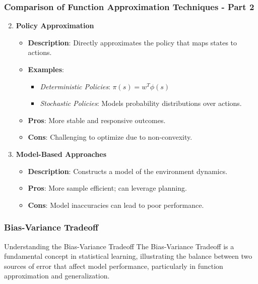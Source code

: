 \documentclass[aspectratio=169]{beamer}
\begin{document}
\begin{frame}[fragile]
    \frametitle{Comparison of Function Approximation Techniques - Part 2}
    \begin{enumerate}
        \setcounter{enumi}{1}
        \item \textbf{Policy Approximation}
        \begin{itemize}
            \item \textbf{Description}: Directly approximates the policy that maps states to actions.
            \item \textbf{Examples}:
            \begin{itemize}
                \item \textit{Deterministic Policies}: \( \pi(s) = w^T \phi(s) \)
                \item \textit{Stochastic Policies}: Models probability distributions over actions.
            \end{itemize}
            \item \textbf{Pros}: More stable and responsive outcomes.
            \item \textbf{Cons}: Challenging to optimize due to non-convexity.
        \end{itemize}
        \item \textbf{Model-Based Approaches}
        \begin{itemize}
            \item \textbf{Description}: Constructs a model of the environment dynamics.
            \item \textbf{Pros}: More sample efficient; can leverage planning.
            \item \textbf{Cons}: Model inaccuracies can lead to poor performance.
        \end{itemize}
    \end{enumerate}
\end{frame}

\begin{frame}[fragile]
    \frametitle{Bias-Variance Tradeoff}
    \begin{block}{Understanding the Bias-Variance Tradeoff}
        The Bias-Variance Tradeoff is a fundamental concept in statistical learning, illustrating the balance between two sources of error that affect model performance, particularly in function approximation and generalization.
    \end{block}
\end{frame}
\end{document}
